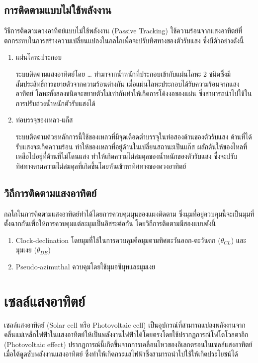 \documentclass[a4paper,nobib,openany,10pt]{tufte-book}
\begin{document}
\section{การติดตามแบบไม่ใช้พลังงาน}
\label{sec:orga41f49e}
วิธีการติดตามดวงอาทิตย์แบบไม่ใช้พลังงาน (Passive Tracking)
ใช้ความร้อนจากแสงอาทิตย์ที่ตกกระทบในการสร้างความเปลี่ยนแปลงในกลไกเพื่อจะปรับทิศทางของตัวรับแสง
ซึ่งมีตัวอย่างดังนี้

\begin{enumerate}
\item แผ่นโลหะประกอบ

ระบบติดตามแสงอาทิตย์โดย \ldots{} ทำมาจากน้ำหนักที่ประกอบเข้ากับแผ่นโลหะ 2
ชนิดซึ่งมีสัมประสิทธิ์การขยายตัวจากความร้อนต่างกัน
เมื่อแผ่นโลหะประกอบได้รับความร้อนจากแสงอาทิตย์
โลหะทั้งสองชนิดจะขยายตัวไม่เท่ากันทำให้เกิดการโค้งงอของแผ่น
ซึ่งสามารถนำไปใช้ในการปรับถ่วงน้ำหนักตัวรับแสงได้

\item ท่อบรรจุของเหลว-แก็ส

ระบบติดตามด้วยหลักการนี้ใช้ของเหลวที่มีจุดเดือดต่ำบรรจุในท่อสองด้านของตัวรับแสง
ด้านที่ได้รับแสงจะเกิดความร้อน
ทำให้ของเหลวที่อยู่ด้านในเปลี่ยนสถานะเป็นแก๊ส
ผลักดันให้ของไหลที่เหลือไปอยู่ที่ด้านที่ไม่โดนแสง
ทำให้เกิดความไม่สมดุลของน้ำหนักของตัวรับแสง
ซึ่งจะปรับทิศทางตามความไม่สมดุลที่เกิดขึ้นโดยหันเข้าหาทิศทางของดวงอาทิตย์
\end{enumerate}

\section{วิถีการติดตามแสงอาทิตย์}
\label{sec:orgc19b6cf}
กลไกในการติดตามแสงอาทิตย์ทำได้ไดยการควบคุมมุนของแผงติดตาม
ซึ่งมุมที่อยู่ควบคุมนี้จะเป็นมุมที่ตั้งฉากกันเพื่อให้การควบคุมแต่ละมุมเป็นอิสระต่อกัน
โดยวิถีการติดตามมีสองแบบดังนี้

\begin{enumerate}
\item Clock-declination โดยมุมที่ใช้ในการควบคุมคือมุมตามทิศตะวันออก-ตะวันตก
(\(\theta_{CL}\)) และมุมเงย (\(\theta_{DE}\))

\item Pseudo-azimuthal ควบคุมโดยใช้มุมอซิมุทและมุมเงย
\end{enumerate}

\chapter{เซลล์แสงอาทิตย์}
\label{sec:org5ce1034}

เซลล์แสงอาทิตย์ (Solar cell หรือ Photovoltaic cell)
เป็นอุปกรณ์ที่สามารถแปลงพลังงานจากคลื่นแม่เหล็กไฟฟ้าในแสงอาทิตย์ให้เป็นพลังงานไฟฟ้าได้โดยตรงโดยใช้ปรากฏการณ์โฟโตโวลตาอิก
(Photovoltaic effect)
ปรากฏการณ์นี้เกิดขึ้นจากการเคลื่อนไหวของอิเลกตรอนในเซลล์แสงอาทิตย์เมื่อได้ดูดซับพลังงานแสงอาทิตย์
ซึ่งทำให้เกิดกระแสไฟฟ้าซึ่งสามารถนำไปใช้ให้เกิดประโยชน์ได้
\end{document}
